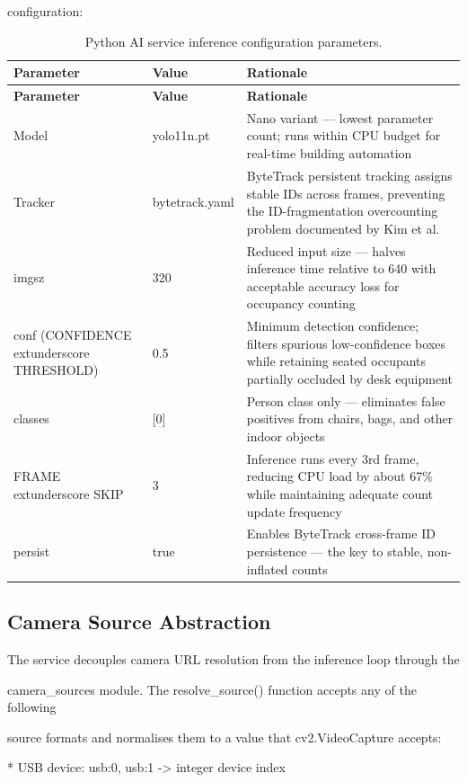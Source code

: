 configuration:

\begin{longtable}{|L{3.2cm}|L{3.2cm}|L{6.2cm}|}
\caption{Python AI service inference configuration parameters.} \label{tab:4-3} \\
\hline
{}
\textbf{Parameter} & \textbf{Value} & \textbf{Rationale} \\
\hline
\endfirsthead
\hline
{}
\textbf{Parameter} & \textbf{Value} & \textbf{Rationale} \\
\hline
\endhead
\hline
\endfoot
\hline
\endlastfoot
Model & yolo11n.pt & Nano variant --- lowest parameter count; runs within CPU budget for real-time building automation \\
\hline
Tracker & bytetrack.yaml & ByteTrack persistent tracking assigns stable IDs across frames, preventing the ID-fragmentation overcounting problem documented by Kim et al. \\
\hline
imgsz & 320 & Reduced input size --- halves inference time relative to 640 with acceptable accuracy loss for occupancy counting \\
\hline
conf (CONFIDENCE	extunderscore THRESHOLD) & 0.5 & Minimum detection confidence; filters spurious low-confidence boxes while retaining seated occupants partially occluded by desk equipment \\
\hline
classes & [0] & Person class only --- eliminates false positives from chairs, bags, and other indoor objects \\
\hline
FRAME	extunderscore SKIP & 3 & Inference runs every 3rd frame, reducing CPU load by about 67\% while maintaining adequate count update frequency \\
\hline
persist & true & Enables ByteTrack cross-frame ID persistence --- the key to stable, non-inflated counts \\
\hline
\end{longtable}


\subsection{Camera Source Abstraction}
The service decouples camera URL resolution from the inference loop through the

camera\_sources module. The resolve\_source() function accepts any of the following

source formats and normalises them to a value that cv2.VideoCapture accepts:

* USB device: usb:0, usb:1 -> integer device index

